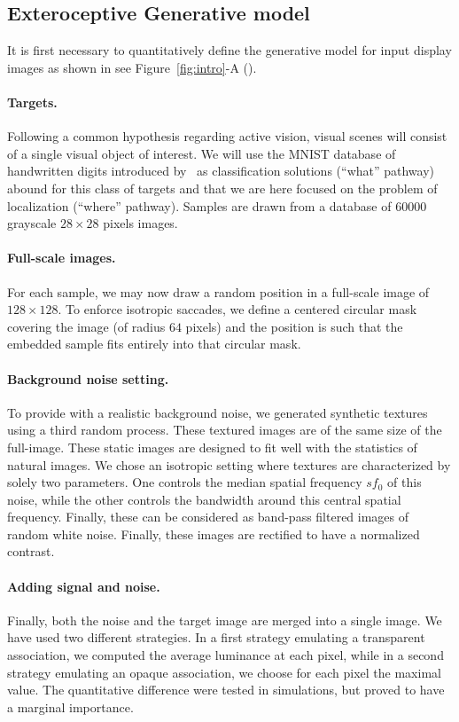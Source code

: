 \subsection{Exteroceptive Generative model}
It is first necessary to quantitatively define the generative model for input display images as shown in see Figure~\ref{fig:intro}-A (\DIS ). 

\paragraph{Targets.} Following a common hypothesis regarding active vision, visual scenes will consist of a single visual object of interest. We will use the MNIST database of handwritten digits introduced by~\citep{Lecun1998} as classification solutions (``what'' pathway) abound for this class of targets and that we are here focused on the problem of localization (``where'' pathway). Samples are drawn from a database of $60000$ grayscale $28\times 28$ pixels images. 
\paragraph{Full-scale images.} For each sample, we may now draw a random position in a full-scale image of $128\times 128$. To enforce isotropic saccades, we define a centered circular mask covering the image (of radius $64$ pixels) and the position is such that the embedded sample fits entirely into that circular mask.
\paragraph{Background noise setting. } To provide with a realistic background noise, we generated synthetic textures~\citep{Sanz12} using a third random process. These textured images are of the same size of the full-image. These static images are designed to fit well with the statistics of natural images. We chose an isotropic setting where textures are characterized by solely two parameters. One controls the median spatial frequency $sf_0$ of this noise, while the other controls the bandwidth around this central spatial frequency. Finally, these can be considered as band-pass filtered images of random white noise. Finally, these images are rectified to have a normalized contrast.
\paragraph{Adding signal and noise. } Finally, both the noise and the target image are merged into a single image. We have used two different strategies. In a first strategy emulating a transparent association, we computed the average luminance at each pixel, while in a second strategy emulating an opaque association, we choose for each pixel the maximal value.
The quantitative difference were tested in simulations, but proved to have a marginal importance.
